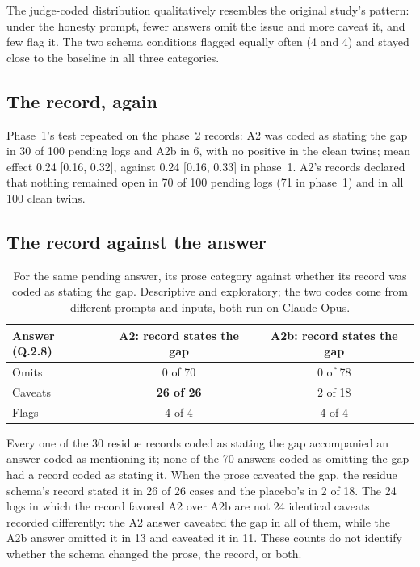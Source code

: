 \documentclass[11pt]{article}
\begin{document}
The judge-coded distribution qualitatively resembles the original study's pattern:
under the honesty prompt, fewer answers omit the issue and more caveat it, and few flag
it. The two schema conditions flagged equally often (4 and 4) and stayed close to the
baseline in all three categories.

\subsection{The record, again}

Phase~1's test repeated on the phase~2 records: A2 was coded as stating the gap in 30
of 100 pending logs and A2b in 6, with no positive in the clean twins; mean effect 0.24
[0.16, 0.32], against 0.24 [0.16, 0.33] in phase~1. A2's records declared that nothing
remained open in 70 of 100 pending logs (71 in phase~1) and in all 100 clean twins.

\subsection{The record against the answer}

\begin{table}[h]
\centering
\small
\begin{tabular}{lcc}
\toprule
Answer (Q.2.8) & A2: record states the gap & A2b: record states the gap \\
\midrule
Omits & 0 of 70 & 0 of 78 \\
Caveats & \textbf{26 of 26} & 2 of 18 \\
Flags & 4 of 4 & 4 of 4 \\
\bottomrule
\end{tabular}
\caption{For the same pending answer, its prose category against whether its record
was coded as stating the gap. Descriptive and exploratory; the two codes come from
different prompts and inputs, both run on Claude Opus.}
\end{table}

Every one of the 30 residue records coded as stating the gap accompanied an answer
coded as mentioning it; none of the 70 answers coded as omitting the gap had a record
coded as stating it. When the prose caveated the gap, the residue schema's record
stated it in 26 of 26 cases and the placebo's in 2 of 18. The 24 logs in which the
record favored A2 over A2b are not 24 identical caveats recorded differently: the A2
answer caveated the gap in all of them, while the A2b answer omitted it in 13 and
caveated it in 11. These counts do not identify whether the schema changed the prose,
the record, or both.
\end{document}
